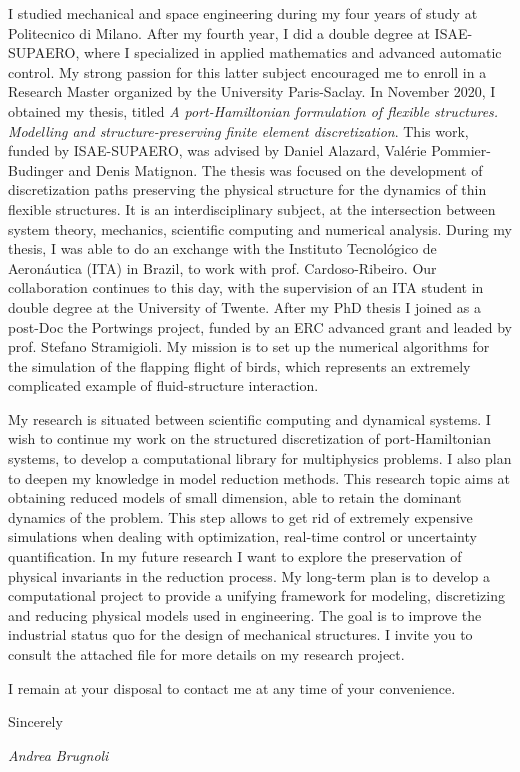 \documentclass[11pt]{letter}
\begin{document}
	I studied mechanical and space engineering during my four years of study at Politecnico di Milano. After my fourth year, I did a double degree at ISAE-SUPAERO, where I specialized in applied mathematics and advanced automatic control. My strong passion for this latter subject encouraged me to enroll in a Research Master organized by the University Paris-Saclay. In November 2020, I obtained my thesis, titled \textit{A port-Hamiltonian formulation of flexible structures. Modelling and structure-preserving finite element discretization}. This work, funded by ISAE-SUPAERO, was advised by Daniel Alazard, Valérie Pommier-Budinger and Denis Matignon. The thesis was focused on the development of discretization paths preserving the physical structure for the dynamics of thin flexible structures. It is an interdisciplinary subject, at the intersection between system theory, mechanics, scientific computing and numerical analysis. During my thesis, I was able to do an exchange with the Instituto Tecnológico de Aeronáutica (ITA) in Brazil, to work with prof. Cardoso-Ribeiro. Our collaboration continues to this day, with the supervision of an ITA student in double degree at the University of Twente. After my PhD thesis I joined as a post-Doc the Portwings project, funded by an ERC advanced grant and leaded by prof. Stefano Stramigioli. My mission is to set up the numerical algorithms for the simulation of the flapping flight of birds, which represents an extremely complicated example of fluid-structure interaction.
	
	My research is situated between scientific computing and dynamical systems. I wish to continue my work on the structured discretization of port-Hamiltonian systems, to develop a computational library for multiphysics problems. I also plan to deepen my knowledge in model reduction methods. This research topic aims at obtaining reduced models of small dimension, able to retain the dominant dynamics of the problem. This step allows to get rid of extremely expensive simulations when dealing with optimization, real-time control or uncertainty quantification. In my future research I want to explore the preservation of physical invariants in the reduction process. My long-term plan is to develop a computational project to provide a unifying framework for modeling, discretizing and reducing physical models used in engineering. The goal is to improve the industrial status quo for the design of mechanical structures. I invite you to consult the attached file for more details on my research project. 
	
 
	I remain at your disposal to contact me at any time of your convenience. 
	
	Sincerely
	
	
	
	\begin{center}
		\large\textit{Andrea Brugnoli}
	\end{center}
\end{document}
